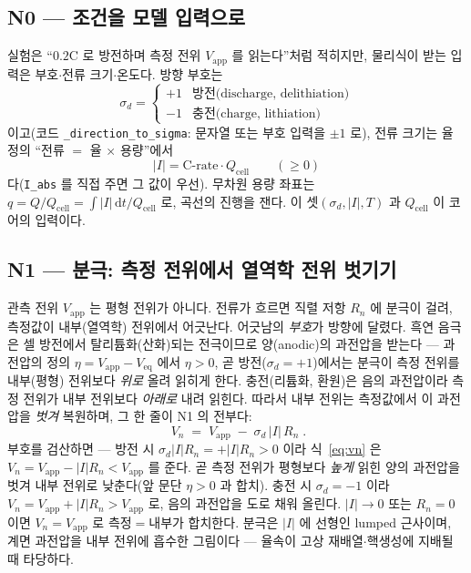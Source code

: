 \documentclass[11pt,a4paper]{article}
\newcommand{\dd}{\mathrm{d}}
\newcommand{\eq}{\mathrm{eq}}
\newcommand{\app}{\mathrm{app}}
\newcommand{\cell}{\mathrm{cell}}
\newcommand{\code}[1]{\texttt{#1}}
\begin{document}
\subsection{N0 — 조건을 모델 입력으로}
실험은 ``$0.2$C 로 방전하며 측정 전위 $V_\app$ 를 읽는다''처럼 적히지만, 물리식이 받는 입력은 부호$\cdot$전류 크기$\cdot$온도다. 방향 부호는
\begin{equation}
\sigma_d=\begin{cases}+1 & \text{방전(discharge, delithiation)}\\ -1 & \text{충전(charge, lithiation)}\end{cases}
\label{eq:sigma}
\end{equation}
이고(코드 \code{\_direction\_to\_sigma}: 문자열 또는 부호 입력을 $\pm1$ 로), 전류 크기는 율 정의 ``전류 $=$ 율 $\times$ 용량''에서
\begin{equation}
|I|=\text{C-rate}\cdot Q_\cell\qquad(\ge0)
\label{eq:Iabs}
\end{equation}
다(\code{I\_abs} 를 직접 주면 그 값이 우선). 무차원 용량 좌표는 $q=Q/Q_\cell=\int|I|\,\dd t/Q_\cell$ 로, 곡선의 진행을 잰다. 이 셋$(\sigma_d,|I|,T)$ 과 $Q_\cell$ 이 코어의 입력이다.

\subsection{N1 — 분극: 측정 전위에서 열역학 전위 벗기기}
관측 전위 $V_\app$ 는 평형 전위가 아니다. 전류가 흐르면 직렬 저항 $R_n$ 에 분극이 걸려, 측정값이 내부(열역학) 전위에서 어긋난다. 어긋남의 \emph{부호}가 방향에 달렸다. 흑연 음극은 셀 방전에서 탈리튬화(산화)되는 전극이므로 양(anodic)의 과전압을 받는다 — 과전압의 정의 $\eta=V_\app-V_{\eq}$ 에서 $\eta>0$, 곧 방전($\sigma_d=+1$)에서는 분극이 측정 전위를 내부(평형) 전위보다 \emph{위로} 올려 읽히게 한다. 충전(리튬화, 환원)은 음의 과전압이라 측정 전위가 내부 전위보다 \emph{아래로} 내려 읽힌다. 따라서 내부 전위는 측정값에서 이 과전압을 \emph{벗겨} 복원하며, 그 한 줄이 N1 의 전부다:
\begin{equation}
\boxed{\;V_n\;=\;V_\app\;-\;\sigma_d\,|I|\,R_n\;.}
\label{eq:vn}
\end{equation}
부호를 검산하면 — 방전 시 $\sigma_d|I|R_n=+|I|R_n>0$ 이라 식~\eqref{eq:vn} 은 $V_n=V_\app-|I|R_n<V_\app$ 를 준다. 곧 측정 전위가 평형보다 \emph{높게} 읽힌 양의 과전압을 벗겨 내부 전위로 낮춘다(앞 문단 $\eta>0$ 과 합치). 충전 시 $\sigma_d=-1$ 이라 $V_n=V_\app+|I|R_n>V_\app$ 로, 음의 과전압을 도로 채워 올린다. $|I|\to0$ 또는 $R_n=0$ 이면 $V_n=V_\app$ 로 측정$=$내부가 합치한다. 분극은 $|I|$ 에 선형인 lumped 근사이며, 계면 과전압을 내부 전위에 흡수한 그림이다 — 율속이 고상 재배열$\cdot$핵생성에 지배될 때 타당하다.
\end{document}
